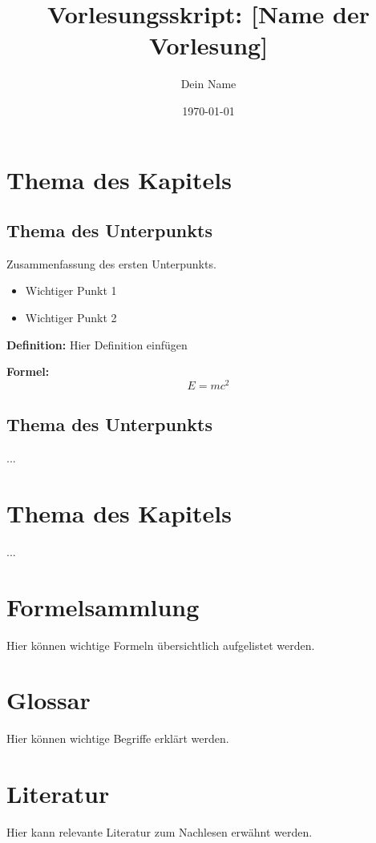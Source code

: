 \documentclass[10pt]{article}
\title{Vorlesungsskript: [Name der Vorlesung]}
\author{Dein Name}
\date{\today}
\begin{document}
\maketitle %
\tableofcontents %

\newpage %

\begin{multicols}{2} %

\section{Thema des Kapitels}

\subsection{Thema des Unterpunkts}

Zusammenfassung des ersten Unterpunkts.

\begin{itemize}
    \item Wichtiger Punkt 1
    \item Wichtiger Punkt 2
\end{itemize}

\textbf{Definition:} Hier Definition einfügen

\textbf{Formel:}
\[
    E = mc^2
\]

\subsection{Thema des Unterpunkts}

...

\section{Thema des Kapitels}

...

\end{multicols} %

\newpage

\appendix
\section{Formelsammlung}

Hier können wichtige Formeln übersichtlich aufgelistet werden.

\section{Glossar}

Hier können wichtige Begriffe erklärt werden.

\section{Literatur}

Hier kann relevante Literatur zum Nachlesen erwähnt werden.

\end{document}
